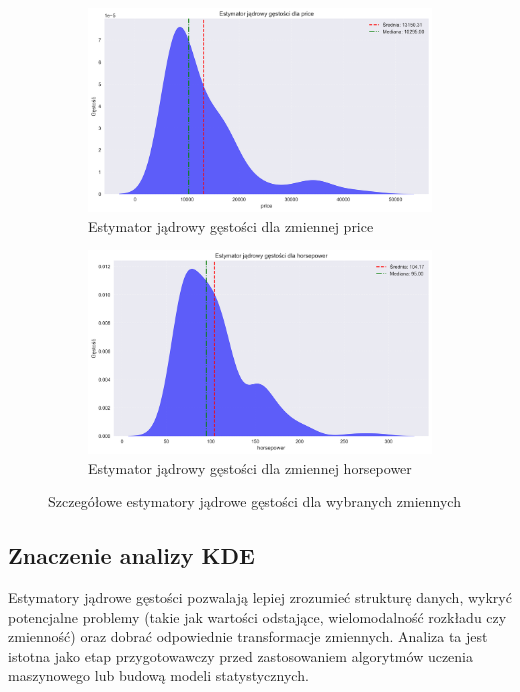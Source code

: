 \documentclass[12pt,a4paper]{article}
\begin{document}
\begin{figure}[H]
    \centering
    \begin{subfigure}[b]{0.48\textwidth}
        \includegraphics[width=\textwidth]{figures/kde_price.png}
        \caption{Estymator jądrowy gęstości dla zmiennej price}
    \end{subfigure}
    \hfill
    \begin{subfigure}[b]{0.48\textwidth}
        \includegraphics[width=\textwidth]{figures/kde_horsepower.png}
        \caption{Estymator jądrowy gęstości dla zmiennej horsepower}
    \end{subfigure}
    \caption{Szczegółowe estymatory jądrowe gęstości dla wybranych zmiennych}
    \label{fig:kde_selected}
\end{figure}

\subsection{Znaczenie analizy KDE}

Estymatory jądrowe gęstości pozwalają lepiej zrozumieć strukturę danych, wykryć potencjalne problemy (takie jak wartości odstające, wielomodalność rozkładu czy zmienność) oraz dobrać odpowiednie transformacje zmiennych. Analiza ta jest istotna jako etap przygotowawczy przed zastosowaniem algorytmów uczenia maszynowego lub budową modeli statystycznych.
\end{document}
